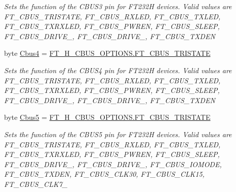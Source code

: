 \begin{DoxyCompactItemize}
\begin{DoxyCompactList}\small\item\em Sets the function of the C\+B\+U\+S3 pin for F\+T232H devices. Valid values are F\+T\+\_\+\+C\+B\+U\+S\+\_\+\+T\+R\+I\+S\+T\+A\+TE, F\+T\+\_\+\+C\+B\+U\+S\+\_\+\+R\+X\+L\+ED, F\+T\+\_\+\+C\+B\+U\+S\+\_\+\+T\+X\+L\+ED, F\+T\+\_\+\+C\+B\+U\+S\+\_\+\+T\+X\+R\+X\+L\+ED, F\+T\+\_\+\+C\+B\+U\+S\+\_\+\+P\+W\+R\+EN, F\+T\+\_\+\+C\+B\+U\+S\+\_\+\+S\+L\+E\+EP, F\+T\+\_\+\+C\+B\+U\+S\+\_\+\+D\+R\+I\+V\+E\+\_, F\+T\+\_\+\+C\+B\+U\+S\+\_\+\+D\+R\+I\+V\+E\+\_, F\+T\+\_\+\+C\+B\+U\+S\+\_\+\+T\+X\+D\+EN \end{DoxyCompactList}\item 
byte \mbox{\hyperlink{class_f_t_d2_x_x___n_e_t_1_1_f_t_d_i_1_1_f_t232_h___e_e_p_r_o_m___s_t_r_u_c_t_u_r_e_a12b3324259302456f473ed95afc92a86}{Cbus4}} = \mbox{\hyperlink{class_f_t_d2_x_x___n_e_t_1_1_f_t_d_i_1_1_f_t__232_h___c_b_u_s___o_p_t_i_o_n_s_a87f6bc339ec2e6bbb3ad093eb9d38278}{F\+T\+\_\+H\+\_\+\+C\+B\+U\+S\+\_\+\+O\+P\+T\+I\+O\+N\+S.\+F\+T\+\_\+\+C\+B\+U\+S\+\_\+\+T\+R\+I\+S\+T\+A\+TE}}
\begin{DoxyCompactList}\small\item\em Sets the function of the C\+B\+U\+S4 pin for F\+T232H devices. Valid values are F\+T\+\_\+\+C\+B\+U\+S\+\_\+\+T\+R\+I\+S\+T\+A\+TE, F\+T\+\_\+\+C\+B\+U\+S\+\_\+\+R\+X\+L\+ED, F\+T\+\_\+\+C\+B\+U\+S\+\_\+\+T\+X\+L\+ED, F\+T\+\_\+\+C\+B\+U\+S\+\_\+\+T\+X\+R\+X\+L\+ED, F\+T\+\_\+\+C\+B\+U\+S\+\_\+\+P\+W\+R\+EN, F\+T\+\_\+\+C\+B\+U\+S\+\_\+\+S\+L\+E\+EP, F\+T\+\_\+\+C\+B\+U\+S\+\_\+\+D\+R\+I\+V\+E\+\_, F\+T\+\_\+\+C\+B\+U\+S\+\_\+\+D\+R\+I\+V\+E\+\_, F\+T\+\_\+\+C\+B\+U\+S\+\_\+\+T\+X\+D\+EN \end{DoxyCompactList}\item 
byte \mbox{\hyperlink{class_f_t_d2_x_x___n_e_t_1_1_f_t_d_i_1_1_f_t232_h___e_e_p_r_o_m___s_t_r_u_c_t_u_r_e_acb297ee6203302033a1491b493f7e822}{Cbus5}} = \mbox{\hyperlink{class_f_t_d2_x_x___n_e_t_1_1_f_t_d_i_1_1_f_t__232_h___c_b_u_s___o_p_t_i_o_n_s_a87f6bc339ec2e6bbb3ad093eb9d38278}{F\+T\+\_\+H\+\_\+\+C\+B\+U\+S\+\_\+\+O\+P\+T\+I\+O\+N\+S.\+F\+T\+\_\+\+C\+B\+U\+S\+\_\+\+T\+R\+I\+S\+T\+A\+TE}}
\begin{DoxyCompactList}\small\item\em Sets the function of the C\+B\+U\+S5 pin for F\+T232H devices. Valid values are F\+T\+\_\+\+C\+B\+U\+S\+\_\+\+T\+R\+I\+S\+T\+A\+TE, F\+T\+\_\+\+C\+B\+U\+S\+\_\+\+R\+X\+L\+ED, F\+T\+\_\+\+C\+B\+U\+S\+\_\+\+T\+X\+L\+ED, F\+T\+\_\+\+C\+B\+U\+S\+\_\+\+T\+X\+R\+X\+L\+ED, F\+T\+\_\+\+C\+B\+U\+S\+\_\+\+P\+W\+R\+EN, F\+T\+\_\+\+C\+B\+U\+S\+\_\+\+S\+L\+E\+EP, F\+T\+\_\+\+C\+B\+U\+S\+\_\+\+D\+R\+I\+V\+E\+\_, F\+T\+\_\+\+C\+B\+U\+S\+\_\+\+D\+R\+I\+V\+E\+\_, F\+T\+\_\+\+C\+B\+U\+S\+\_\+\+I\+O\+M\+O\+DE, F\+T\+\_\+\+C\+B\+U\+S\+\_\+\+T\+X\+D\+EN, F\+T\+\_\+\+C\+B\+U\+S\+\_\+\+C\+L\+K30, F\+T\+\_\+\+C\+B\+U\+S\+\_\+\+C\+L\+K15, F\+T\+\_\+\+C\+B\+U\+S\+\_\+\+C\+L\+K7\+\_ \end{DoxyCompactList}\item 

\end{DoxyCompactItemize}
